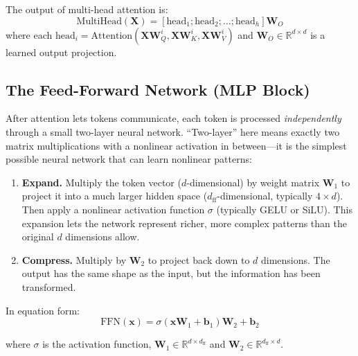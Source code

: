 The output of multi-head attention is:
\begin{equation}
  \text{MultiHead}(\bm{X}) =
  [\text{head}_1; \text{head}_2; \ldots; \text{head}_h]\bm{W}_O
\end{equation}
where each $\text{head}_i = \text{Attention}(\bm{X}\bm{W}_Q^i,
\bm{X}\bm{W}_K^i, \bm{X}\bm{W}_V^i)$ and $\bm{W}_O \in
\mathbb{R}^{d \times d}$ is a learned output projection.

\subsection{The Feed-Forward Network (MLP Block)}
\label{sec:ffn}

After attention lets tokens communicate, each token is processed
\emph{independently} through a small two-layer neural network.
``Two-layer'' here means exactly two matrix multiplications with a
nonlinear activation in between---it is the simplest possible neural
network that can learn nonlinear patterns:

\begin{enumerate}[leftmargin=2em]
  \item \textbf{Expand.} Multiply the token vector ($d$-dimensional)
    by weight matrix $\bm{W}_1$ to project it into a much larger
    hidden space ($d_{\text{ff}}$-dimensional, typically $4 \times d$).
    Then apply a nonlinear activation function $\sigma$ (typically GELU
    or SiLU). This expansion lets the network represent richer,
    more complex patterns than the original $d$ dimensions allow.
  \item \textbf{Compress.} Multiply by $\bm{W}_2$ to project back down
    to $d$ dimensions. The output has the same shape as the input, but
    the information has been transformed.
\end{enumerate}

In equation form:
\begin{equation}
  \text{FFN}(\bm{x}) = \sigma(\bm{x}\bm{W}_1 + \bm{b}_1)\bm{W}_2 + \bm{b}_2
  \label{eq:ffn}
\end{equation}

where $\sigma$ is the activation function,
$\bm{W}_1 \in \mathbb{R}^{d \times d_{\text{ff}}}$ and
$\bm{W}_2 \in \mathbb{R}^{d_{\text{ff}} \times d}$.

